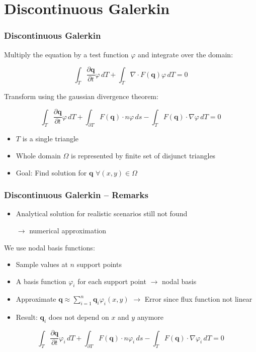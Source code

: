 \documentclass{beamer}
\newcommand{\todo}[1]{
  \textcolor{red}{TODO: #1}
  \note{\textcolor{red}{TODO: #1}}
}
\renewcommand{\todo}[1]{}
\newcommand{\pd}[2]{\dfrac{\partial #1}{\partial #2}}
\renewcommand{\phi}{\varphi}
\begin{document}
\section{Discontinuous Galerkin}
\label{sec:basis-functions-intro}

\begin{frame}
  \frametitle{Discontinuous Galerkin}
  Multiply the equation by a test function $\phi$ and integrate over the domain:
  
  \begin{equation}
    \label{eq:shallow-water-weak-form}
    \int_T \pd {\mathbf{q}}{t} \phi \, dT + \int_T \nabla \cdot F(\mathbf{q}) \phi \, dT = 0
  \end{equation}

  Transform using the gaussian divergence theorem:

  \begin{equation}
    \label{eq:shallow-water-dg}
    \int_T \pd {\mathbf{q}}{t} \phi \, dT +
    \int_{\partial T} F(\mathbf{q}) \cdot n \phi \, ds -
    \int_T F(\mathbf{q}) \cdot \nabla \phi \, dT = 0
  \end{equation}
  
  \begin{itemize}
  \item $T$ is a single triangle
  \item Whole domain $\Omega$ is represented by finite set of disjunct triangles
  \item Goal: Find solution for $\mathbf{q}$ $\forall \left(x,y\right) \in \Omega$
  \end{itemize}

\end{frame}

\begin{frame}
  \frametitle{Discontinuous Galerkin -- Remarks}
  \begin{itemize}
  \item Analytical solution for realistic scenarios still not found

  $\rightarrow$ numerical approximation
  \end{itemize}
  We use nodal basis functions:
  \begin{itemize}  
  \item Sample values at $n$ support points
  \item A basis function $\phi_i$ for each support point $\rightarrow$ nodal basis
  \item Approximate 
    $\mathbf{q} \approx \sum_{i=1}^n \mathbf{q}_i \phi_i(x,y)$ $\rightarrow$ Error since flux function not linear \todo{Correct?}
  \item Result: $\mathbf{q}_i$ does not depend on $x$ and $y$ anymore
  \end{itemize}

  \begin{equation}
    \label{eq:shallow-water-phi-i}
    \int_T \pd {\mathbf{q}}{t} \phi_i \, dT +
    \int_{\partial T} F(\mathbf{q}) \cdot n \phi_i \, ds -
    \int_T F(\mathbf{q}) \cdot \nabla \phi_i \, dT = 0
  \end{equation}
\end{frame}
\end{document}
